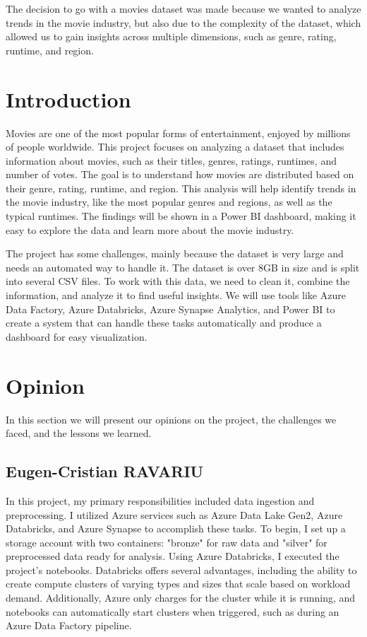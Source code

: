 \documentclass[a4paper,12pt]{article}
\begin{document}
The decision to go with a movies dataset was made because we wanted to analyze trends in 
the movie industry, but also due to the complexity of the dataset, which allowed us to gain 
insights across multiple dimensions, such as genre, rating, runtime, and region.

\newpage
\tableofcontents  %
\newpage

\section{Introduction}
\label{sec:introduction}

Movies are one of the most popular forms of entertainment, enjoyed by millions of people worldwide. 
This project focuses on analyzing a dataset that includes information about movies, such as their titles, 
genres, ratings, runtimes, and number of votes. The goal is to understand how movies are distributed based 
on their genre, rating, runtime, and region. This analysis will help identify trends in the movie industry, 
like the most popular genres and regions, as well as the typical runtimes. The findings will be shown in a 
Power BI dashboard, making it easy to explore the data and learn more about the movie industry.

The project has some challenges, mainly because the dataset is very large and needs an automated way 
to handle it. The dataset is over 8GB in size and is split into several CSV files. To work with this data, 
we need to clean it, combine the information, and analyze it to find useful insights. We will use tools like 
Azure Data Factory, Azure Databricks, Azure Synapse Analytics, and Power BI to create a system that can handle 
these tasks automatically and produce a dashboard for easy visualization.

\section{Opinion}
\label{sec:opinion}

In this section we will present our opinions on the project, the challenges we faced, and the lessons we learned.

\subsection{Eugen-Cristian RAVARIU}

In this project, my primary responsibilities included data ingestion and preprocessing. I utilized Azure services such as Azure Data Lake Gen2, Azure Databricks, and Azure Synapse to accomplish these tasks.
To begin, I set up a storage account with two containers: "bronze" for raw data and "silver" for preprocessed data ready for analysis. Using Azure Databricks, I executed the project's notebooks. 
Databricks offers several advantages, including the ability to create compute clusters of varying types and sizes that scale based on workload demand. 
Additionally, Azure only charges for the cluster while it is running, and notebooks can automatically start clusters when triggered, such as during an Azure Data Factory pipeline.
\end{document}
